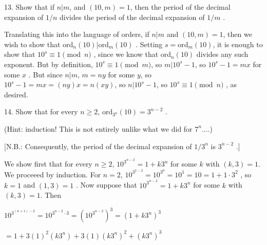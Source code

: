

\ctln{\centerline}
\ssk{\smallskip}
\msk{\medskip}
\bsk{\bigskip}
\def\ni{\noindent}

\overfullrule=0pt
\nopagenumbers




\bsk

 

\bsk

\item{13.} Show that if $n|m$, and $(10,m)=1$, then the 
period of the decimal expansion of $1/n$ divides the
period of the decimal expansion of $1/m$ .

\msk

\ni Translating this into the language of orders, if $n|m$ and $(10,m)=1$, then
we wish to show that ord$_n(10)|$ord$_m(10)$ . Setting $s=$ord$_m(10)$, it is enough to show that
$10^s\equiv 1\pmod{n}$ , since we know that ord$_n(10)$ divides any such 
exponent. But by definition, $10^s\equiv 1\pmod{m}$, so $m|10^s-1$, so
$10^s-1=mx$ for some $x$ . But since $n|m$, $m=ny$ for some $y$, so 
$10^s-1=mx=(ny)x=n(xy)$, so $n|10^s-1$, so  $10^s\equiv 1\pmod{n}$ , as
desired.

\bsk

\item{14.} Show that for every $n\geq 2$, $\text{ord}_{3^n}(10)=3^{n-2}$ .

\ssk

\item{} (Hint: induction! This is not entirely unlike what we did for $7^n$....) 

\item{} [N.B.: Consequently, the period of the decimal expansion of $1/3^n$ is $3^{n-2}$ .]


\msk

\ni We show first that for every $n\geq 2$, $\displaystyle 10^{3^{n-2}}=1+k3^n$ for some $k$ with $(k,3)=1$.
We proceeed by induction. For $n=2$, $\displaystyle 10^{3^{2-2}}=10^{3^0} = 10^1 = 10 = 1+1\cdot 3^2$ , so 
$k=1$ and $(1,3)=1$ . Now suppose that $\displaystyle 10^{3^{n-2}}=1+k3^n$ for some $k$ with $(k,3)=1$. 
Then 

\ssk

\hskip1in $\displaystyle 10^{3^{(n+1)-2}}=10^{3^{n-2}\cdot 3}=(10^{3^{n-2}})^3=(1+k3^n)^3$

\hskip1in $= 1+3(1)^2(k3^n)+3(1)(k3^n)^2+(k3^n)^3$

